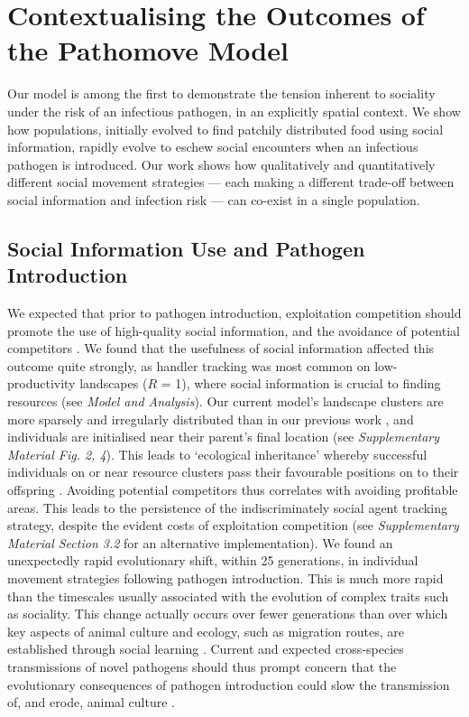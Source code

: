 \section*{Contextualising the Outcomes of the Pathomove Model}

Our model is among the first to demonstrate the tension inherent to sociality under the risk of an infectious pathogen, in an explicitly spatial context.
We show how populations, initially evolved to find patchily distributed food using social information, rapidly evolve to eschew social encounters when an infectious pathogen is introduced.
Our work shows how qualitatively and quantitatively different social movement strategies --- each making a different trade-off between social information and infection risk --- can co-exist in a single population.

\subsection*{Social Information Use and Pathogen Introduction}

We expected that prior to pathogen introduction, exploitation competition should promote the use of high-quality social information, and the avoidance of potential competitors \citep[handler tracking;][]{gupte2021a}.
We found that the usefulness of social information affected this outcome quite strongly, as handler tracking was most common on low-productivity landscapes ($R$ = 1), where social information is crucial to finding resources (see \textit{Model and Analysis}).
Our current model's landscape clusters are more sparsely and irregularly distributed than in our previous work \citep{gupte2021a}, and individuals are initialised near their parent's final location (see \textit{Supplementary Material Fig. 2, 4}).
This leads to `ecological inheritance' whereby successful individuals on or near resource clusters pass their favourable positions on to their offspring \citep{badyaev2009}.
Avoiding potential competitors thus correlates with avoiding profitable areas.
This leads to the persistence of the indiscriminately social agent tracking strategy, despite the evident costs of exploitation competition (see \textit{Supplementary Material Section 3.2} for an alternative implementation).
We found an unexpectedly rapid evolutionary shift, within 25 generations, in individual movement strategies following pathogen introduction.
This is much more rapid than the timescales usually associated with the evolution of complex traits such as sociality.
This change actually occurs over fewer generations than over which key aspects of animal culture and ecology, such as migration routes, are established through social learning \citep{jesmer2018,cantor2021}.
Current and expected cross-species transmissions of novel pathogens \citep{carlson2022a,pusceddu2021} should thus prompt concern that the evolutionary consequences of pathogen introduction could slow the transmission of, and erode, animal culture \citep{cantor2021}.

